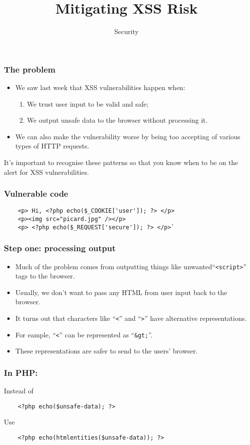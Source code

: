 \documentclass[10pt]{beamer}
\title{Mitigating XSS Risk}
\author[IN618]{Security}
\institute[Otago Polytechnic]{
  Otago Polytechnic \\
  Dunedin, New Zealand \\
}
\date{}
\begin{document}
\begin{frame}[plain]
  \titlepage
\end{frame}


\begin{frame}
	\frametitle{The problem}
	\begin{itemize}
		\item We saw last week that XSS vulnerabilities happen when:
			\begin{enumerate}
				\item We trust user input to be valid and safe;
				\item We output unsafe data to the browser without 
					processing it.
			\end{enumerate}
		\item We can also make the vulnerability worse by being too accepting
			of various types of HTTP requests.
	\end{itemize}

	It's important to recognise these patterns so that you know when to be 
	on the alert for XSS vulnerabilities.
\end{frame}

\begin{frame}[fragile]
	\frametitle{Vulnerable code}
	\begin{verbatim}
    <p> Hi, <?php echo($_COOKIE['user']); ?> </p> 
    <p><img src="picard.jpg" /></p>
    <p> <?php echo($_REQUEST['secure']); ?> </p>`
	\end{verbatim}
\end{frame}

\begin{frame}
	\frametitle{Step one: processing output}

	\begin{itemize}
		\item Much of the problem comes from outputting things
			like unwanted``\texttt{<script>}'' tags to the browser.
		\item Usually, we don't want to pass any HTML from user input
			back to the browser.
		\item It turns out that characters like ``\texttt{<}'' and
			``\texttt{>}'' have alternative representations.
		\item For eample, ``\texttt{<}'' can be represented as 
			``\texttt{\&gt;}''.
		\item These representations are safer to send to the users' browser.
	\end{itemize}
\end{frame}
\begin{frame}[fragile]
	\frametitle{In PHP:}
	Instead of 
	\begin{verbatim}
    <?php echo($unsafe-data); ?> 
	\end{verbatim}
	Use
	\begin{verbatim}
    <?php echo(htmlentities($unsafe-data)); ?> 
	\end{verbatim}
\end{frame}
\end{document}
